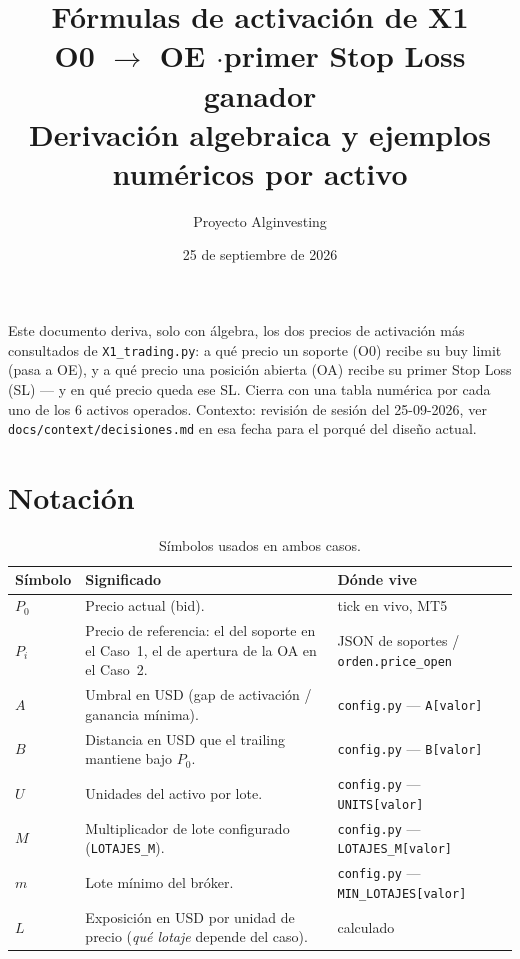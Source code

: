 \documentclass[11pt,a4paper]{article}
\title{\vspace{-1.4cm}\textbf{Fórmulas de activación de X1}\\[6pt]
  \large O0 $\to$ OE \quad$\cdot$\quad primer Stop Loss ganador\\[4pt]
  \normalsize\color{cgris} Derivación algebraica y ejemplos numéricos por activo}
\author{Proyecto Alginvesting}
\date{25 de septiembre de 2026}
\newcommand{\code}[1]{\texttt{\small #1}}
\begin{document}
\maketitle
\thispagestyle{empty}

\begin{center}
\begin{minipage}{0.86\linewidth}
\small\color{cgris}
Este documento deriva, solo con álgebra, los dos precios de activación más consultados
de \code{X1_trading.py}: a qué precio un soporte (O0) recibe su buy limit (pasa a OE), y
a qué precio una posición abierta (OA) recibe su primer Stop Loss (SL) — y en qué precio
queda ese SL. Cierra con una tabla numérica por cada uno de los 6 activos operados.
Contexto: revisión de sesión del 25-09-2026, ver \code{docs/context/decisiones.md} en
esa fecha para el porqué del diseño actual.
\end{minipage}
\end{center}

\vspace{8pt}
\tableofcontents
\newpage

\section{Notación}

\begin{table}[h]
\centering
\small
\begin{tabularx}{\linewidth}{@{}l X l@{}}
\toprule
\textbf{Símbolo} & \textbf{Significado} & \textbf{Dónde vive} \\
\midrule
$P_0$ & Precio actual (bid). & tick en vivo, MT5 \\
$P_i$ & Precio de referencia: el del soporte en el Caso~1, el de apertura de la OA en el Caso~2. & JSON de soportes / \code{orden.price\_open} \\
$A$ & Umbral en USD (gap de activación / ganancia mínima). & \code{config.py} — \code{A[valor]} \\
$B$ & Distancia en USD que el trailing mantiene bajo $P_0$. & \code{config.py} — \code{B[valor]} \\
$U$ & Unidades del activo por lote. & \code{config.py} — \code{UNITS[valor]} \\
$M$ & Multiplicador de lote configurado (\code{LOTAJES\_M}). & \code{config.py} — \code{LOTAJES\_M[valor]} \\
$m$ & Lote mínimo del bróker. & \code{config.py} — \code{MIN\_LOTAJES[valor]} \\
$L$ & Exposición en USD por unidad de precio (\emph{qué lotaje} depende del caso). & calculado \\
\bottomrule
\end{tabularx}
\caption{Símbolos usados en ambos casos.}
\end{table}
\end{document}
